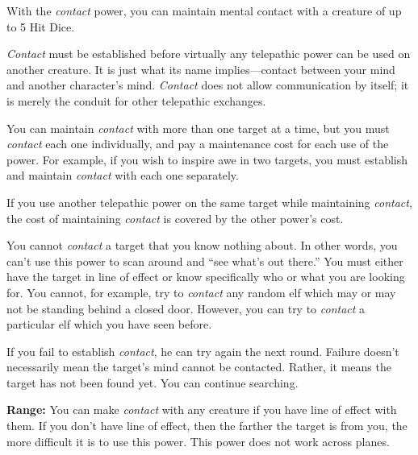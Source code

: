 {
	With the \emph{contact} power, you can maintain mental contact with a creature of up to 5 Hit Dice.

	\emph{Contact} must be established before virtually any telepathic power can be used on another creature. It is just what its name implies---contact between your mind and another character's mind. \emph{Contact} does not allow communication by itself; it is merely the conduit for other telepathic exchanges.

	You can maintain \emph{contact} with more than one target at a time, but you must \emph{contact} each one individually, and pay a maintenance cost for each use of the power. For example, if you wish to inspire awe in two targets, you must establish and maintain \emph{contact} with each one separately.

	If you use another telepathic power on the same target while maintaining \emph{contact}, the cost of maintaining \emph{contact} is covered by the other power's cost.

	You cannot \emph{contact} a target that you know nothing about. In other words, you can't use this power to scan around and ``see what's out there.'' You must either have the target in line of effect or know specifically who or what you are looking for. You cannot, for example, try to \emph{contact} any random elf which may or may not be standing behind a closed door. However, you can try to \emph{contact} a particular elf which you have seen before.

	If you fail to establish \emph{contact}, he can try again the next round. Failure doesn't necessarily mean the target's mind cannot be contacted. Rather, it means the target has not been found yet. You can continue searching.

	\textbf{Range:} You can make \emph{contact} with any creature if you have line of effect with them. If you don't have line of effect, then the farther the target is from you, the more difficult it is to use this power. This power does not work across planes.


}
